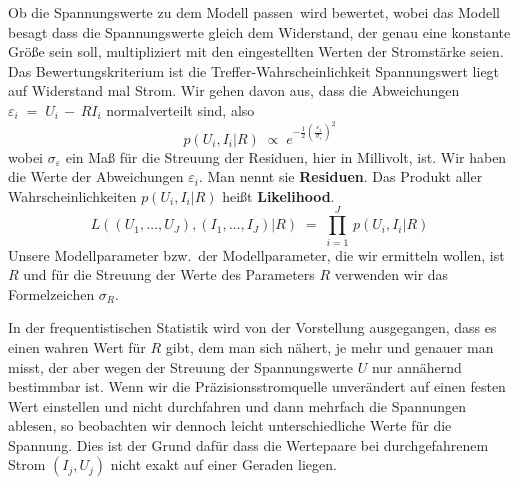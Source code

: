 \documentclass[a4paper,12pt,DIV=15]{scrartcl}
\begin{document}
Ob die Spannungswerte zu dem Modell \glqq passen\grqq ~wird bewertet, wobei das Modell
besagt dass die Spannungswerte gleich dem Widerstand, der genau eine konstante Größe sein soll,
multipliziert mit den eingestellten Werten der Stromstärke seien. Das Bewertungskriterium ist
\glqq die Treffer-Wahrscheinlichkeit Spannungswert liegt auf Widerstand mal Strom\grqq.
Wir gehen davon aus, dass die Abweichungen $\varepsilon_i \; = \; U_i \, - \, R I_i$ normalverteilt sind, also
\begin{equation}
p(U_i,I_i | R) \; \propto \; e^{-\frac{1}{2} \left(\frac{\varepsilon_i}{\sigma_\varepsilon}\right)^2}
\end{equation}
wobei $\sigma_\varepsilon$ ein Maß für die Streuung der Residuen, hier in Millivolt, ist.
Wir haben die Werte der Abweichungen $\varepsilon_i$. Man nennt sie \textbf{Residuen}.
Das Produkt aller Wahrscheinlichkeiten $p(U_i,I_i | R)$ heißt \textbf{Likelihood}.
\begin{equation}
L((U_1,\dots, U_J), (I_1,\dots,I_J) | R) \; = \; \prod\limits_{i = 1}^J \, p(U_i,I_i | R)
\end{equation}
Unsere Modellparameter bzw.\ der Modellparameter, die wir ermitteln wollen, ist $R$ und
für die Streuung der Werte des Parameters $R$ verwenden wir das Formelzeichen $\sigma_R$.

In der frequentistischen Statistik wird von der Vorstellung ausgegangen, dass es einen wahren Wert für
$R$ gibt, dem man sich nähert, je mehr und genauer man misst, der aber wegen der Streuung
der Spannungswerte $U$ nur annähernd bestimmbar ist. Wenn wir die Präzisionsstromquelle unverändert
auf einen festen Wert einstellen und nicht durchfahren und dann mehrfach die Spannungen ablesen, so
beobachten wir dennoch leicht unterschiedliche Werte für die Spannung. Dies ist der Grund dafür
dass die Wertepaare bei durchgefahrenem Strom $(I_j, U_j)$ nicht exakt auf einer Geraden liegen.
\end{document}
